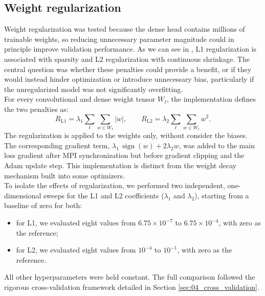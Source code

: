 
\subsection{Weight regularization}
\label{sec:04_regularization_tuning}

Weight regularization was tested because the dense head contains millions of trainable weights, so reducing unnecessary parameter magnitude could in principle improve validation performance. As we can see in \cite{tibshirani1996lasso,hoerl1970ridge}, L1 regularization is associated with sparsity and L2 regularization with continuous shrinkage. The central question was whether these penalties could provide a benefit, or if they would instead hinder optimization or introduce unnecessary bias, particularly if the unregularized model was not significantly overfitting.\\

For every convolutional and dense weight tensor $W_\ell$, the implementation defines the two penalties as:
\begin{equation}
    R_{\mathrm{L1}}=\lambda_1\sum_{\ell}\sum_{w\in W_\ell}|w|,
    \qquad
    R_{\mathrm{L2}}=\lambda_2\sum_{\ell}\sum_{w\in W_\ell}w^2.
    \label{eq:04_regularization}
\end{equation}
The regularization is applied to the weights only, without consider the biases. The corresponding gradient term, $\lambda_1\,\operatorname{sign}(w)+2\lambda_2 w$, was added to the main loss gradient after MPI synchronization but before gradient clipping and the Adam update step. This implementation is distinct from the weight decay mechanism built into some optimizers.\\

To isolate the effects of regularization, we performed two independent, one-dimensional sweeps for the L1 and L2 coefficients ($\lambda_1$ and $\lambda_2$), starting from a baseline of zero for both:
\begin{itemize}
    \item[-] for L1, we evaluated eight values from $6.75\times 10^{-7}$ to $6.75\times 10^{-4}$, with zero as the reference;
    \item[-] for L2, we evaluated eight values from $10^{-4}$ to $10^{-1}$, with zero as the reference. 
\end{itemize}
All other hyperparameters were held constant. The full comparison followed the rigorous cross-validation framework detailed in Section \ref{sec:04_cross_validation}.\\

